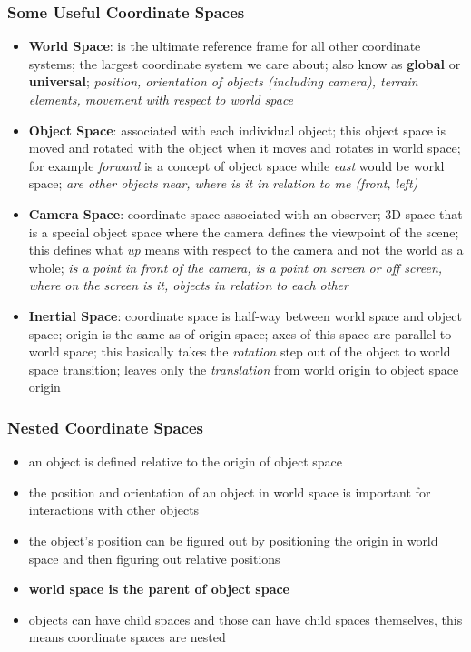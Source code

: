 \documentclass[a4paper,11pt]{amsart}
\begin{document}
\subsubsection{Some Useful Coordinate Spaces}
\begin{itemize}
    \item \textbf{World Space}: is the ultimate reference frame for all other 
        coordinate systems; the largest coordinate system we care about; also 
        know as \textbf{global} or \textbf{universal}; \textit{position, 
        orientation of objects (including camera), terrain elements, movement 
        with respect to world space}
    \item \textbf{Object Space}: associated with each individual object; this
        object space is moved and rotated with the object when it moves and
        rotates in world space; for example \textit{forward} is a concept of
        object space while \textit{east} would be world space; \textit{are
        other objects near, where is it in relation to me (front, left)}
    \item \textbf{Camera Space}: coordinate space associated with an observer;
        3D space that is a special object space where the camera defines the
        viewpoint of the scene; this defines what \textit{up} means with
        respect to the camera and not the world as a whole; \textit{is a point
        in front of the camera, is a point on screen or off screen, where on
        the screen is it, objects in relation to each other}
    \item \textbf{Inertial Space}: coordinate space is half-way between world
        space and object space; origin is the same as of origin space; axes of
        this space are parallel to world space; this basically takes the
        \textit{rotation} step out of the object to world space transition; 
        leaves only the \textit{translation} from world origin to object space origin
\end{itemize}

\subsubsection{Nested Coordinate Spaces}
\begin{itemize}
    \item an object is defined relative to the origin of object space
    \item the position and orientation of an object in world space is important
        for interactions with other objects
    \item the object's position can be figured out by positioning the origin in 
        world space and then figuring out relative positions
    \item \textbf{world space is the parent of object space}
    \item objects can have child spaces and those can have child spaces 
        themselves, this means coordinate spaces are nested
\end{itemize}
\end{document}
